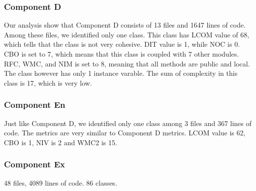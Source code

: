 \subsubsection{Component D}
Our analysis show that Component D consists of 13 files and 1647 lines of code. Among these files, we identified only one class. This class has LCOM value of 68, which tells that the class is not very cohesive. DIT value is 1, while NOC is 0. CBO is set to 7, which means that this class is coupled with 7 other modules. RFC, WMC, and NIM is set to 8, meaning that all methods are public and local. The class however has only 1 instance varable. The sum of complexity in this class is 17, which is very low. 



\subsubsection{Component En}
Just like Component D, we identified only one class among 3 files and 367 lines of code. The metrics are very similar to Component D metrics. LCOM value is 62, CBO is 1, NIV is 2 and WMC2 is 15. 





\subsubsection{Component Ex}
48 files, 4089 lines of code. 86 classes.


